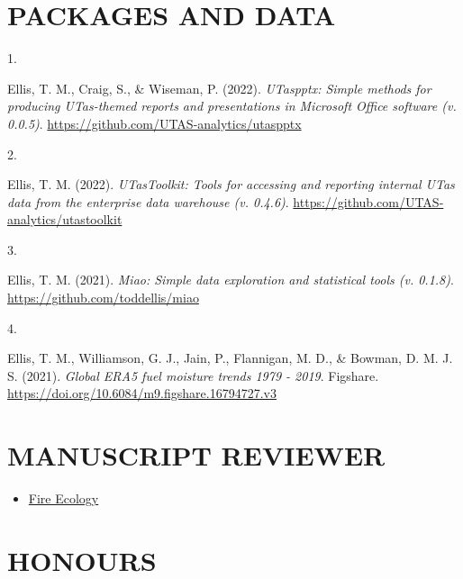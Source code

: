 \documentclass[11pt,a4paper,]{awesome-cv}
\providecommand{\tightlist}{%
	\setlength{\itemsep}{0pt}\setlength{\parskip}{0pt}}
\newlength{\csllabelwidth}
\newcommand{\CSLLeftMargin}[1]{\parbox[t]{\csllabelwidth}{#1}}
\newcommand{\CSLRightInline}[1]{\parbox[t]{\linewidth - \csllabelwidth}{#1}}
\begin{document}
\hypertarget{packages-and-data}{%
\section{PACKAGES AND DATA}\label{packages-and-data}}

\hypertarget{bibliography}{}
\leavevmode{}%
\CSLLeftMargin{1. }
\CSLRightInline{Ellis, T. M., Craig, S., \& Wiseman, P. (2022).
\emph{UTaspptx: Simple methods for producing UTas-themed reports and
presentations in Microsoft Office software (v. 0.0.5)}.
\url{https://github.com/UTAS-analytics/utaspptx}}

\leavevmode{}%
\CSLLeftMargin{2. }
\CSLRightInline{Ellis, T. M. (2022). \emph{UTasToolkit: Tools for
accessing and reporting internal UTas data from the enterprise data
warehouse (v. 0.4.6)}.
\url{https://github.com/UTAS-analytics/utastoolkit}}

\leavevmode{}%
\CSLLeftMargin{3. }
\CSLRightInline{Ellis, T. M. (2021). \emph{Miao: Simple data exploration
and statistical tools (v. 0.1.8)}.
\url{https://github.com/toddellis/miao}}

\leavevmode{}%
\CSLLeftMargin{4. }
\CSLRightInline{Ellis, T. M., Williamson, G. J., Jain, P., Flannigan, M.
D., \& Bowman, D. M. J. S. (2021). \emph{Global ERA5 fuel moisture
trends 1979 - 2019}. Figshare.
\url{https://doi.org/10.6084/m9.figshare.16794727.v3}}

\hypertarget{manuscript-reviewer}{%
\section{MANUSCRIPT REVIEWER}\label{manuscript-reviewer}}

\begin{itemize}
\tightlist
\item
  \href{https://link.springer.com/journal/42408}{Fire Ecology}
\end{itemize}

\hypertarget{honours}{%
\section{HONOURS}\label{honours}}
\end{document}
